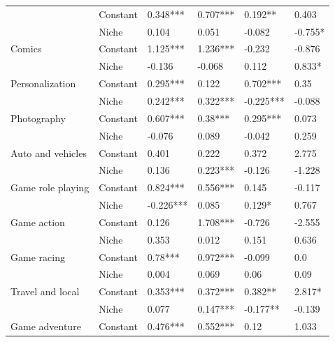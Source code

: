 \begin{longtable}[h!]{llllll}
\bottomrule
\endlastfoot
\multirow{2}{*}{Art and design} & Constant &            0.348*** &    0.707*** &    0.192** &      0.403 \\
          & Niche &               0.104 &       0.051 &     -0.082 &    -0.755* \\
\cline{1-6}
\multirow{2}{*}{Comics} & Constant &            1.125*** &    1.236*** &     -0.232 &     -0.876 \\
          & Niche &              -0.136 &      -0.068 &      0.112 &     0.833* \\
\cline{1-6}
\multirow{2}{*}{Personalization} & Constant &            0.295*** &       0.122 &   0.702*** &       0.35 \\
          & Niche &            0.242*** &    0.322*** &  -0.225*** &     -0.088 \\
\cline{1-6}
\multirow{2}{*}{Photography} & Constant &            0.607*** &     0.38*** &   0.295*** &      0.073 \\
          & Niche &              -0.076 &       0.089 &     -0.042 &      0.259 \\
\cline{1-6}
\multirow{2}{*}{Auto and vehicles} & Constant &               0.401 &       0.222 &      0.372 &      2.775 \\
          & Niche &               0.136 &    0.223*** &     -0.126 &     -1.228 \\
\cline{1-6}
\multirow{2}{*}{Game role playing} & Constant &            0.824*** &    0.556*** &      0.145 &     -0.117 \\
          & Niche &           -0.226*** &       0.085 &     0.129* &      0.767 \\
\cline{1-6}
\multirow{2}{*}{Game action} & Constant &               0.126 &    1.708*** &     -0.726 &     -2.555 \\
          & Niche &               0.353 &       0.012 &      0.151 &      0.636 \\
\cline{1-6}
\multirow{2}{*}{Game racing} & Constant &             0.78*** &    0.972*** &     -0.099 &        0.0 \\
          & Niche &               0.004 &       0.069 &       0.06 &       0.09 \\
\cline{1-6}
\multirow{2}{*}{Travel and local} & Constant &            0.353*** &    0.372*** &    0.382** &     2.817* \\
          & Niche &               0.077 &    0.147*** &   -0.177** &     -0.139 \\
\cline{1-6}
\multirow{2}{*}{Game adventure} & Constant &            0.476*** &    0.552*** &       0.12 &      1.033 \\

\end{longtable}
